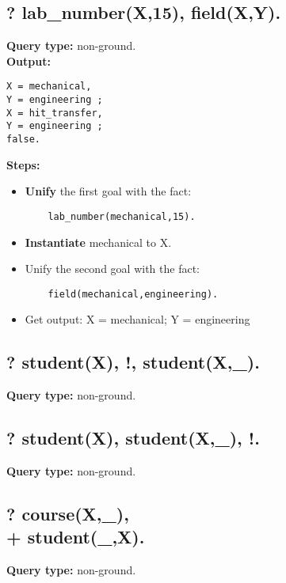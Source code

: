 \subsection{? lab\_number(X,15), field(X,Y).}
\textbf{Query type: } non-ground. \\
\textbf{Output:} \\
\begin{lstlisting}
X = mechanical,
Y = engineering ;
X = hit_transfer,
Y = engineering ;
false.
\end{lstlisting}

\textbf{Steps:}
\begin{itemize}
    \item \textbf{Unify} the first goal with the fact:
    \begin{lstlisting}
    lab_number(mechanical,15).
    \end{lstlisting}
    \item \textbf{Instantiate} mechanical to X.
    \item Unify the second goal with the fact:
    \begin{lstlisting}
    field(mechanical,engineering).
    \end{lstlisting}
\item Get output: X = mechanical; Y = engineering
\end{itemize}


\subsection{? student(X), !, student(X,\_). } 
\textbf{Query type: } non-ground. \\


\subsection{? student(X), student(X,\_), !.}
\textbf{Query type: } non-ground. \\


\subsection{? course(X,\_), \\+ student(\_,X). } 
\textbf{Query type: } non-ground. \\

\newpage

